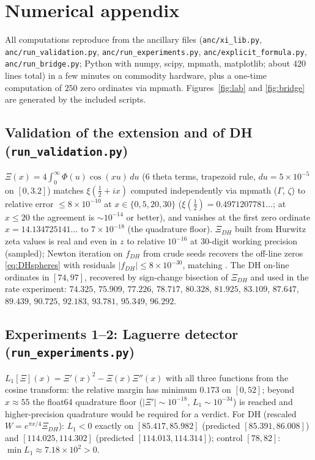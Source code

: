 \documentclass[11pt]{amsart}
\theoremstyle{plain}
\theoremstyle{definition}
\theoremstyle{remark}
\newcommand{\dd}{\,d}
\begin{document}
\appendix
\section{Numerical appendix}\label{app:numerics}

All computations reproduce from the ancillary files (\texttt{anc/xi\_lib.py},
\texttt{anc/run\_validation.py}, \texttt{anc/run\_experiments.py},
\texttt{anc/explicit\_formula.py}, \texttt{anc/run\_bridge.py}; Python with numpy, scipy,
mpmath, matplotlib; about $420$ lines total) in a few minutes on commodity hardware, plus a
one-time computation of $250$ zero ordinates via mpmath.
Figures~\ref{fig:lab} and \ref{fig:bridge} are generated by the included scripts.

\subsection{Validation of the extension and of DH (\texttt{run\_validation.py})}
$\Xi(x)=4\int_0^\infty\Phi(u)\cos(xu)\dd u$ ($6$ theta terms, trapezoid rule,
$du=5\times10^{-5}$ on $[0,3.2]$) matches $\xi(\tfrac12+ix)$ computed independently via mpmath
($\Gamma$, $\zeta$) to relative error $\le8\times10^{-10}$ at $x\in\{0,5,20,30\}$
($\xi(\tfrac12)=0.4971207781\ldots$; at $x\le20$ the agreement is $\sim10^{-14}$ or better),
and vanishes at the first zero ordinate
$x=14.134725141\ldots$ to $7\times10^{-18}$ (the quadrature floor). $\Xi_{DH}$ built from
Hurwitz zeta values is real and even in $z$ to relative $10^{-16}$ at $30$-digit working
precision (sampled); Newton iteration on $f_{DH}$ from crude seeds recovers the off-line zeros
\eqref{eq:DHspheres} with residuals $|f_{DH}|\le8\times10^{-30}$, matching \cite{Spira1994}.
The DH on-line ordinates in $[74,97]$, recovered by sign-change bisection of $\Xi_{DH}$ and
used in the rate experiment:
$74.325$, $75.909$, $77.226$, $78.717$, $80.328$, $81.925$, $83.109$, $87.647$, $89.439$,
$90.725$, $92.183$, $93.781$, $95.349$, $96.292$.

\subsection{Experiments 1--2: Laguerre detector (\texttt{run\_experiments.py})}
$L_1[\Xi](x)=\Xi'(x)^2-\Xi(x)\Xi''(x)$ with all three functions from the cosine transform:
the relative margin has minimum $0.173$ on $[0,52]$; beyond $x\approx55$ the float64 quadrature
floor ($|\Xi'|\sim10^{-18}$, $L_1\sim10^{-34}$) is reached and higher-precision quadrature would
be required for a verdict. For DH (rescaled $W=e^{\pi x/4}\Xi_{DH}$): $L_1<0$ exactly on
$[85.417,85.982]$ (predicted $[85.391,86.008]$) and $[114.025,114.302]$ (predicted
$[114.013,114.314]$); control $[78,82]$: $\min L_1\approx7.18\times10^2>0$.
\end{document}
